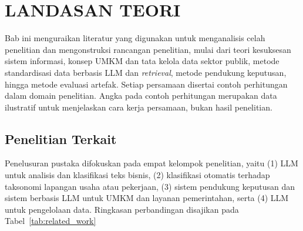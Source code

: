 \documentclass[12pt,a4paper]{report}
\begin{document}
\chapter{LANDASAN TEORI}
\label{chap:teori}

Bab ini menguraikan literatur yang digunakan untuk menganalisis celah penelitian dan mengonstruksi rancangan penelitian, mulai dari teori kesuksesan sistem informasi, konsep UMKM dan tata kelola data sektor publik, metode standardisasi data berbasis LLM dan \textit{retrieval}, metode pendukung keputusan, hingga metode evaluasi artefak. Setiap persamaan disertai contoh perhitungan dalam domain penelitian. Angka pada contoh perhitungan merupakan data ilustratif untuk menjelaskan cara kerja persamaan, bukan hasil penelitian.

\section{Penelitian Terkait}
\label{sec:terkait}

Penelusuran pustaka difokuskan pada empat kelompok penelitian, yaitu (1) LLM untuk analisis dan klasifikasi teks bisnis, (2) klasifikasi otomatis terhadap taksonomi lapangan usaha atau pekerjaan, (3) sistem pendukung keputusan dan sistem berbasis LLM untuk UMKM dan layanan pemerintahan, serta (4) LLM untuk pengelolaan data. Ringkasan perbandingan disajikan pada Tabel~\ref{tab:related_work}
\end{document}

